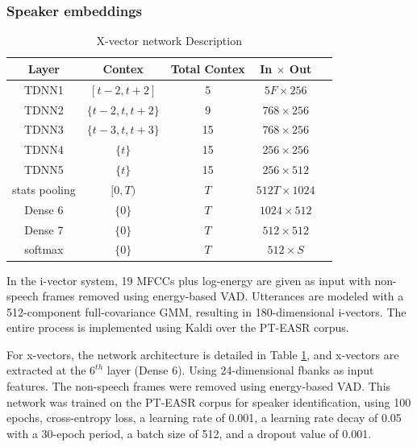 \subsubsection{Speaker embeddings}
\begin{table}[h]
  \centering
  \begin{tabular}{ccccc}
  \hline
  Layer & Contex & Total Contex & In $\times$ Out \\
  \hline
  TDNN1 & $[t-2, t+2]$ & 5 & $5F \times 256$ & \\
  TDNN2 & $\{t-2, t, t+2\}$ & 9 & $768 \times 256$ & \\
  TDNN3 & $\{t-3, t, t+3\}$ & 15 & $768 \times 256$ & \\
  TDNN4 & $\{t\}$ & 15 & $256 \times 256$ & \\
  TDNN5 & $\{t\}$ & 15 & $256 \times 512$ & \\
  stats pooling & $[0, T)$ & $T$ & $512T \times 1024$ & \\
  Dense 6 & $\{0\}$ & $T$ & $1024 \times 512$ & \\
  Dense 7 & $\{0\}$ & $T$ & $512 \times 512$ & \\
  softmax & $\{0\}$ & $T$ & $512 \times S$ & \\
  \hline
  \end{tabular}
  \caption{X-vector network Description}
  \label{tab:xvect_description}
  \end{table}
  In the i-vector system, 19 \acp{MFCC} plus log-energy are given as input  with non-speech frames removed using energy-based \ac{VAD}. Utterances are modeled with a 512-component full-covariance GMM, resulting in 180-dimensional i-vectors. The entire process is implemented using Kaldi \cite{kaldi} over the PT-EASR corpus.

  For x-vectors, the network architecture is detailed in Table \ref{tab:xvect_description}, and x-vectors are extracted at the $6^{th}$ layer (Dense 6). Using 24-dimensional fbanks as input features. The non-speech frames were removed using energy-based \ac{VAD}. This network was trained on the PT-EASR corpus for speaker identification, using 100 epochs, cross-entropy loss, a learning rate of 0.001, a learning rate decay of 0.05 with a 30-epoch period, a batch size of 512, and a dropout value of 0.001.

